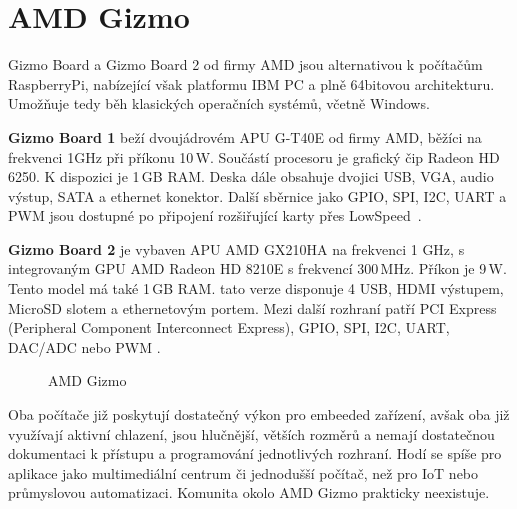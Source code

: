  \section{AMD Gizmo}
\label{KapAMD}

	Gizmo Board a Gizmo Board 2 od firmy AMD jsou alternativou k počítačům RaspberryPi, nabízející však platformu IBM PC a plně 64bitovou architekturu. Umožňuje tedy běh klasických operačních systémů, včetně Windows.
	
		\textbf{Gizmo Board 1} beží dvoujádrovém APU G-T40E od firmy AMD, běžíci na frekvenci 1GHz při příkonu 10\,W. Součástí procesoru je grafický čip Radeon HD 6250. K dispozici je 1\,GB RAM. Deska dále obsahuje dvojici USB, VGA, audio výstup, SATA a ethernet konektor. Další sběrnice jako GPIO, SPI, I2C, UART a PWM jsou dostupné po připojení rozšiřující karty přes LowSpeed~\cite{AmdGizmo1}.
	
	\textbf{ Gizmo Board 2} je vybaven APU AMD GX210HA na frekvenci 1 GHz, s integrovaným GPU AMD Radeon HD 8210E s frekvencí 300\,MHz. Příkon je 9\,W. Tento model má také 1\,GB RAM. tato verze disponuje 4 USB, HDMI výstupem, MicroSD slotem a ethernetovým portem. Mezi další rozhraní patří PCI Express (Peripheral Component Interconnect Express), GPIO, SPI, I2C, UART, DAC/ADC nebo PWM \cite{AmdGizmo2}.


\begin{figure}[!ht]
    \centering
			\hspace*{5mm}
		\caption{AMD Gizmo}
\end{figure}



	
Oba počítače již poskytují dostatečný výkon pro embeeded zařízení, avšak oba již využívají aktivní chlazení, jsou hlučnější, větších rozměrů a nemají dostatečnou dokumentaci k přístupu a programování jednotlivých rozhraní. Hodí se spíše pro aplikace jako multimediální centrum či jednodušší počítač, než pro IoT nebo průmyslovou automatizaci. Komunita okolo AMD Gizmo prakticky neexistuje.
	
	



